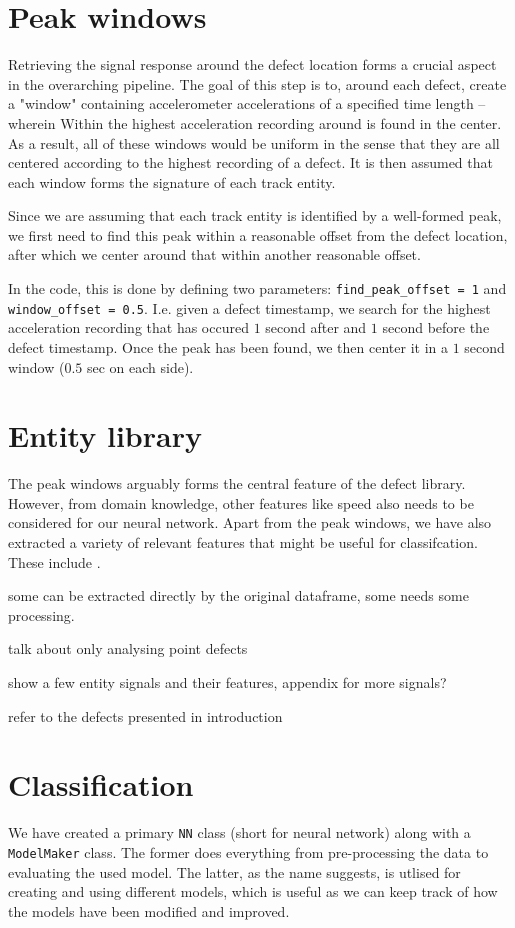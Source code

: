 \section{Peak windows}
Retrieving the signal response around the defect location forms a crucial aspect in the overarching pipeline. The goal of this step is to, around each defect, create a "window" containing accelerometer accelerations of a specified time length -- wherein Within the highest acceleration recording around is found in the center. As a result, all of these windows would be uniform in the sense that they are all centered according to the highest recording of a defect. It is then assumed that each window forms the signature of each track entity. 

Since we are assuming that each track entity is identified by a well-formed peak, we first need to find this peak within a reasonable offset from the defect location, after which we center around that within another reasonable offset. 

In the code, this is done by defining two parameters: \verb|find_peak_offset = 1| and \verb|window_offset = 0.5|. I.e. given a defect timestamp, we search for the highest acceleration recording that has occured $1$ second after and $1$ second before the defect timestamp. Once the peak has been found, we then center it in a $1$ second window ($0.5$ sec on each side). 

\section{Entity library}
The peak windows arguably forms the central feature of the defect library. However, from domain knowledge, other features like speed also needs to be considered for our neural network. Apart from the peak windows, we have also extracted a variety of relevant features that might be useful for classifcation. These include .

some can be extracted directly by the original dataframe, some needs some processing.

talk about only analysing point defects

show a few entity signals and their features, appendix for more signals? 

refer to the defects presented in introduction

\section{Classification}
We have created a primary \verb|NN| class (short for neural network) along with a \verb|ModelMaker| class. The former does everything from pre-processing the data to evaluating the used model. The latter, as the name suggests, is utlised for creating and using different models, which is useful as we can keep track of how the models have been modified and improved. 

